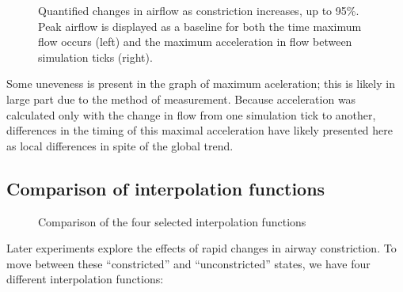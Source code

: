 \begin{figure}[ht!]
    \centering
    \begin{subfigure}[t]{.45\textwidth}
        \centering
        \begin{tikzpicture}[scale=.75]
            
        \end{tikzpicture}
    \end{subfigure}%
    \hspace{2em}%
    \begin{subfigure}[t]{.45\textwidth}
        \centering
        \begin{tikzpicture}[scale=.75]
            
        \end{tikzpicture}
    \end{subfigure}%
    \caption{
        Quantified changes in airflow as constriction increases, up to 95\%. Peak airflow is
        displayed as a baseline for both the time maximum flow occurs (left) and the maximum
        acceleration in flow between simulation ticks (right).
    }
    \label{fig:constricted-flow-stats}
\end{figure}

Some uneveness is present in the graph of maximum aceleration; this is likely in large part due to
the method of measurement. Because acceleration was calculated only with the change in flow from one
simulation tick to another, differences in the timing of this maximal acceleration have likely
presented here as local differences in spite of the global trend.

\subsection{Comparison of interpolation functions}

\begin{figure}[ht!]
    \centering
    \begin{tikzpicture}
        
    \end{tikzpicture}
    \caption{Comparison of the four selected interpolation functions}
    \label{fig:interpolate-functions}
\end{figure}

Later experiments explore the effects of rapid changes in airway constriction. To move between these
``constricted'' and ``unconstricted'' states, we have four different interpolation functions:

